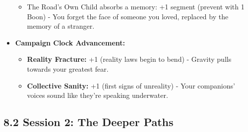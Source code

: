 \documentclass[11pt]{article}
\begin{document}
\begin{itemize}
\begin{itemize}
\item The Road's Own Child absorbs a memory: +1 segment (prevent with 1 Boon) - You forget the face of someone you loved, replaced by the memory of a stranger.
\end{itemize}
\item \textbf{Campaign Clock Advancement:}
\begin{itemize}
\item \textbf{Reality Fracture:} +1 (reality laws begin to bend) - Gravity pulls towards your greatest fear.
\item \textbf{Collective Sanity:} +1 (first signs of unreality) - Your companions' voices sound like they're speaking underwater.
\end{itemize}
\end{itemize}

\clearpage

\subsection*{8.2 Session 2: The Deeper Paths}
\end{document}

